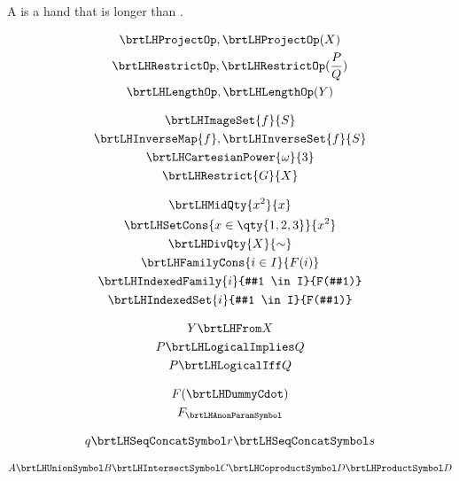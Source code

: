 \documentclass{article}
\begin{document}
    A  is a hand that is longer than
    .

    \begin{gather}
        \brtLHProjectOp ,
        \brtLHProjectOp(X)
        \\
        \brtLHRestrictOp ,
        \brtLHRestrictOp(\frac P Q)
        \\
        \brtLHLengthOp ,
        \brtLHLengthOp(Y)
    \end{gather}

    \begin{gather}
        \brtLHImageSet {f} {S}
        \\
        \brtLHInverseMap {f} ,
        \brtLHInverseSet {f} {S}
        \\
        \brtLHCartesianPower {\omega} {3}
        \\
        \brtLHRestrict {G} {X}
    \end{gather}

    \begin{gather}
        \brtLHMidQty {x^2} {x}
        \\
        \brtLHSetCons {x \in \qty{1,2,3}} {x^2}
        \\
        \brtLHDivQty {X} {\sim}
        \\
        \brtLHFamilyCons {i \in I} {F(i)}
        \\
        \brtLHIndexedFamily {i} {#1 \in I} {F(#1)}
        \\
        \brtLHIndexedSet {i} {#1 \in I} {F(#1)}
    \end{gather}

    \begin{gather}
        Y \brtLHFrom X
        \\
        P \brtLHLogicalImplies Q
        \\
        P \brtLHLogicalIff Q
    \end{gather}

    \begin{gather}
        F(\brtLHDummyCdot)
        \\
        F_{\brtLHAnonParamSymbol}
    \end{gather}

    \begin{gather}
        q
        \brtLHSeqConcatSymbol
        r
        \brtLHSeqConcatSymbol
        s
    \end{gather}

    \begin{gather}
        A
        \brtLHUnionSymbol B
        \brtLHIntersectSymbol C
        \brtLHCoproductSymbol D
        \brtLHProductSymbol D
    \end{gather}
\end{document}

